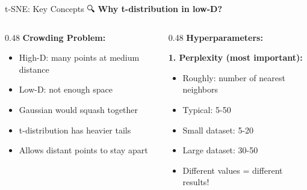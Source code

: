 \documentclass[aspectratio=169]{beamer}
\begin{document}
\begin{frame}[shrink=10]{t-SNE: Key Concepts 🔍}
\textbf{Why t-distribution in low-D?}

\vspace{1em}

\begin{columns}[T]
\begin{column}{0.48\textwidth}
\textbf{Crowding Problem:}
\begin{itemize}\setlength{\itemsep}{0pt}
    \item High-D: many points at medium distance
    \item Low-D: not enough space
    \item Gaussian would squash together
    \item t-distribution has heavier tails
    \item Allows distant points to stay apart
\end{itemize}

\vspace{1em}
\begin{center}
\end{center}
\end{column}

\begin{column}{0.48\textwidth}
\textbf{Hyperparameters:}

\vspace{0.3em}
\textbf{1. Perplexity (most important):}
\begin{itemize}\setlength{\itemsep}{0pt}
    \item Roughly: number of nearest neighbors
    \item Typical: 5-50
    \item Small dataset: 5-20
    \item Large dataset: 30-50
    \item \alert{Different values = different results!}
\end{itemize}


\end{column}
\end{columns}
\end{frame}
\end{document}
